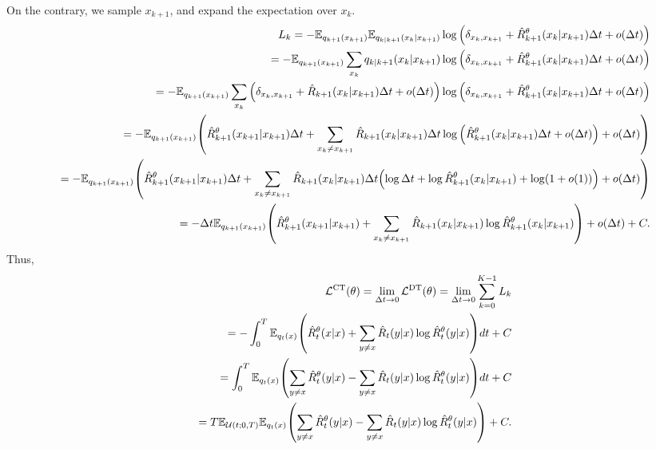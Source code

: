 \documentclass[10pt]{article}
\begin{document}
On the contrary, we sample $x_{k+1}$, and expand the expectation over $x_k$.
\begin{eqnarray*}
  &&L_k = - \mathbb{E}_{q_{k+1}(x_{k+1})}\mathbb{E}_{q_{k|k+1}\qty(x_k|x_{k+1})}\log \qty(\delta_{x_k,x_{k+1}} + \hat{R}_{k+1}^\theta\qty(x_k|x_{k+1})\Delta t + o(\Delta t)) \\
  &&= - \mathbb{E}_{q_{k+1}(x_{k+1})}\sum_{x_k}q_{k|k+1}\qty(x_k|x_{k+1})\log \qty(\delta_{x_k,x_{k+1}} + \hat{R}_{k+1}^\theta\qty(x_k|x_{k+1})\Delta t + o(\Delta t)) \\
  &&= - \mathbb{E}_{q_{k+1}(x_{k+1})}\sum_{x_k}\qty(\delta_{x_k,x_{k+1}} + \hat{R}_{k+1}\qty(x_k|x_{k+1})\Delta t + o(\Delta t))\log \qty(\delta_{x_k,x_{k+1}} + \hat{R}_{k+1}^\theta\qty(x_k|x_{k+1})\Delta t + o(\Delta t)) \\
  &&= - \mathbb{E}_{q_{k+1}(x_{k+1})}\qty(\hat{R}_{k+1}^\theta\qty(x_{k+1}|x_{k+1})\Delta t + \sum_{x_k\neq x_{k+1}}\hat{R}_{k+1}\qty(x_k|x_{k+1})\Delta t \log \qty(\hat{R}_{k+1}^\theta\qty(x_k|x_{k+1})\Delta t + o(\Delta t)) + o(\Delta t)) \\
  &&= -\mathbb{E}_{q_{k+1}(x_{k+1})}\qty(\hat{R}_{k+1}^\theta\qty(x_{k+1}|x_{k+1})\Delta t + \sum_{x_k\neq x_{k+1}}\hat{R}_{k+1}\qty(x_k|x_{k+1})\Delta t \qty(\log\Delta t + \log \hat{R}_{k+1}^\theta\qty(x_k|x_{k+1}) + \log(1 + o(1))) + o(\Delta t)) \\
  &&= -\Delta t\mathbb{E}_{q_{k+1}(x_{k+1})}\qty(\hat{R}_{k+1}^\theta\qty(x_{k+1}|x_{k+1}) + \sum_{x_k\neq x_{k+1}}\hat{R}_{k+1}\qty(x_k|x_{k+1}) \log \hat{R}_{k+1}^\theta\qty(x_k|x_{k+1})) + o(\Delta t) + C.
\end{eqnarray*}
Thus,
\begin{eqnarray*}
  &&\mathcal{L}^\text{CT}(\theta) = \lim_{\Delta t\to 0}\mathcal{L}^\text{DT}(\theta) = \lim_{\Delta t\to 0}\sum_{k=0}^{K-1}L_k \\
  &&= - \int_0^T \mathbb{E}_{q_t(x)}\qty(\hat{R}_t^\theta(x|x) + \sum_{y\neq x}\hat{R}_t(y|x)\log\hat{R}_t^\theta(y|x))dt + C\\
  &&=\int_0^T \mathbb{E}_{q_t(x)}\qty(\sum_{y\neq x}\hat{R}_t^\theta(y|x) - \sum_{y\neq x}\hat{R}_t(y|x)\log\hat{R}_t^\theta(y|x))dt + C\\
  &&=T\mathbb{E}_{\mathcal{U}(t;0,T)}\mathbb{E}_{q_t(x)}\qty(\sum_{y\neq x}\hat{R}_t^\theta(y|x) - \sum_{y\neq x}\hat{R}_t(y|x)\log\hat{R}_t^\theta(y|x)) + C.
\end{eqnarray*}





\end{document}
